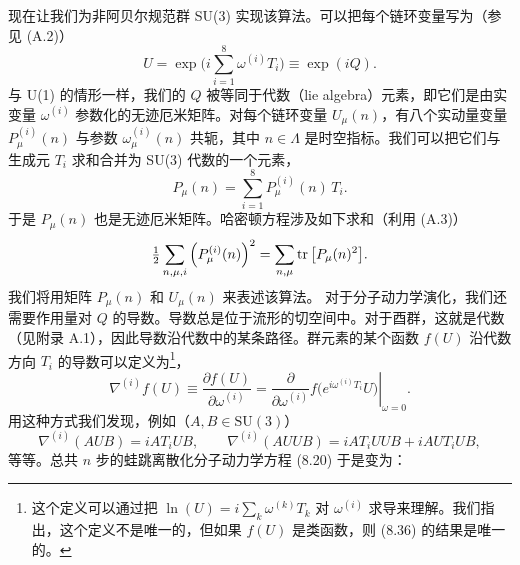 现在让我们为非阿贝尔规范群 SU(3) 实现该算法。可以把每个链环变量写为（参见 (A.2)）
\begin{equation}
U = \exp\Big(i\sum_{i=1}^{8}\omega^{(i)}T_i\Big) \equiv \exp(iQ).
\end{equation}
与 U(1) 的情形一样，我们的 $Q$ 被等同于代数（lie algebra）元素，即它们是由实变量 $\omega^{(i)}$ 参数化的无迹厄米矩阵。对每个链环变量 $U_\mu(n)$，有八个实动量变量 $P_\mu^{(i)}(n)$ 与参数 $\omega_\mu^{(i)}(n)$ 共轭，其中 $n \in \Lambda$ 是时空指标。我们可以把它们与生成元 $T_i$ 求和合并为 SU(3) 代数的一个元素，
\begin{equation}
P_\mu(n) = \sum_{i=1}^{8}P_\mu^{(i)}(n)\,T_i.
\end{equation}
于是 $P_\mu(n)$ 也是无迹厄米矩阵。哈密顿方程涉及如下求和（利用 (A.3)）
\begin{equation}
\tfrac{1}{2}\sum_{n,\mu,i}\Big(P_\mu^{(i)}(n)\Big)^2 = \sum_{n,\mu}\operatorname{tr}\big[P_\mu(n)^2\big].
\end{equation}
我们将用矩阵 $P_\mu(n)$ 和 $U_\mu(n)$ 来表述该算法。
对于分子动力学演化，我们还需要作用量对 $Q$ 的导数。导数总是位于流形的切空间中。对于酉群，这就是代数（见附录 A.1），因此导数沿代数中的某条路径。群元素的某个函数 $f(U)$ 沿代数方向 $T_i$ 的导数可以定义为\footnote{这个定义可以通过把 $\ln(U) = i\sum_k \omega^{(k)}T_k$ 对 $\omega^{(i)}$ 求导来理解。我们指出，这个定义不是唯一的，但如果 $f(U)$ 是类函数，则 (8.36) 的结果是唯一的。}，
\begin{equation}
\nabla^{(i)}f(U) \equiv \frac{\partial f(U)}{\partial\omega^{(i)}}
= \left.\frac{\partial}{\partial\omega^{(i)}}f\big(e^{i\omega^{(i)}T_i}U\big)\right|_{\omega=0}.
\end{equation}
用这种方式我们发现，例如（$A, B \in \mathrm{SU}(3)$）
\begin{equation}
\nabla^{(i)}(AUB) = iAT_iUB, \qquad
\nabla^{(i)}(AUUB) = iAT_iUUB + iAUT_iUB,
\end{equation}
等等。总共 $n$ 步的蛙跳离散化分子动力学方程 (8.20) 于是变为：
